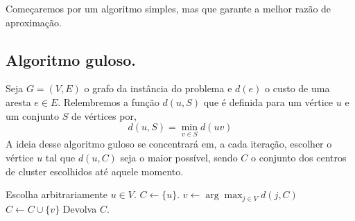 \documentclass[12pt]{article}
\begin{document}
    Começaremos por um algoritmo simples, mas que garante a melhor razão de aproximação.
    
\newpage
\subsection{Algoritmo guloso.}
    Seja $G = (V,E)$ o grafo da instância do problema e $d(e)$ o custo de uma aresta $e \in E$.
    Relembremos a função $d(u,S)$ que é definida para um vértice $u$ e um conjunto $S$ de vértices  por,
    \[ d(u,S) = \min_{v\in S} d(uv)
        \]
    A ideia desse algoritmo guloso se concentrará em, a cada iteração, escolher o vértice $u$ tal que $d(u,C)$ seja o maior possível, sendo $C$ o conjunto dos centros de cluster escolhidos até aquele momento.

    \begin{algorithm}
		\begin{algorithmic}[1]
			\State Escolha arbitrariamente $u \in V$.
            \State $C \gets \{u\}$.
            \State $v \gets \arg\max_{j \in V} d(j,C)$
            \State $C \gets C \cup \{v\}$
            \EndWhile 
			\State Devolva $C$.
			\EndFunction
		\end{algorithmic}
	\end{algorithm}
    
\end{document}
